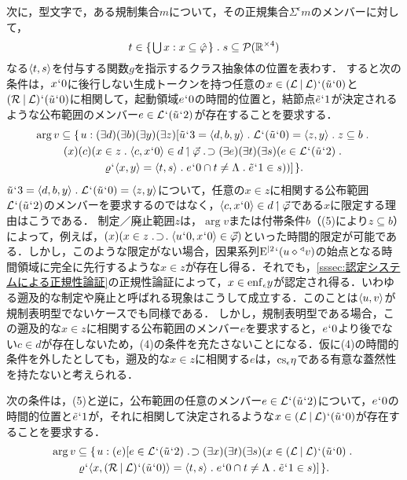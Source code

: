 次に，型文字\kagi{$ \varrho $}で，ある規制集合$ m $について，その正規集合$ \varSigma^{\epsilon}m $のメンバーに対して，
\[
    t\in\classab{\union{x}:x\subseteq\hat\varphi}\con{1}s\subseteq\mathcal{P}(\timex{\mathbb{R}}{4})
\]
なる$\langle t,s \rangle$を付与する関数$ g $を指示するクラス抽象体の位置を表わす．
すると次の条件は，$x{\mspace{1mu}{`}\mspace{1mu}} 0$に後行しない生成トークンを持つ任意の$ x\in (\mathcal{L}\mathbin{\mid}\mathcal{L}){\mspace{1mu}{`}\mspace{1mu}}(\tilde{u}{\mspace{1mu}{`}\mspace{1mu}} 0) $と$ (\mathcal{R}\mathbin{\mid}\mathcal{L}){\mspace{1mu}{`}\mspace{1mu}}(\tilde{u}{\mspace{1mu}{`}\mspace{1mu}} 0) $に相関して，起動領域$e{\mspace{1mu}{`}\mspace{1mu}} 0$の時間的位置と，結節点$ \tilde{e}{\mspace{1mu}{`}\mspace{1mu}} 1 $が決定されるような公布範囲のメンバー$ e\in \mathcal{L}{\mspace{1mu}{`}\mspace{1mu}}(\tilde{u}{\mspace{1mu}{`}\mspace{1mu}} 2) $が存在することを要求する．
\begin{multline}
    \arg v \subseteq \classab{u:(\exists d)(\exists b)(\exists y)(\exists z)[
        \tilde{u}\fap 3 = \orp{d,b,y}\con{1}\mathcal{L}\fap(\tilde{u}\fap 0) = \orp{z,y}\con{1}z\subseteq b \con{1}\\
        (x)(c)(x\in z\con{1}\orp{c,x\fap 0}\in d\uphl\vec{\varphi}\case{1}{1}{0}
        (\exists e)(\exists t)(\exists s)(e\in \mathcal{L}\fap(\tilde{u}\fap 2)\con{1}\\
            \varrho\fap\orp{x,y} = \orp{t,s}\con{1}e\fap 0\cap t\neq\Lambda\con{1}\tilde{e}\fap 1\in s
        )
        )
    ]
    }.
\end{multline}
$ \tilde{u}\fap 3 = \orp{d,b,y}\con{1}\mathcal{L}\fap(\tilde{u}\fap 0) = \orp{z,y} $について，任意の$ x\in z $に相関する公布範囲$ \mathcal{L}{\mspace{1mu}{`}\mspace{1mu}}(\tilde{u}{\mspace{1mu}{`}\mspace{1mu}} 2) $のメンバーを要求するのではなく，$ \langle c,x{\mspace{1mu}{`}\mspace{1mu}} 0 \rangle\in d\mathbin{\upharpoonleft}\vec{\varphi} $である$x$に限定する理由はこうである．
制定／廃止範囲$ z $は，$ \arg v $または付帯条件$b$（(5)により$ z\subseteq b $）によって，例えば，$ (x)(x\in z\case{1}{1}{1}\orp{u\fap 0,x\fap 0}\in\vec{\varphi}) $といった時間的限定が可能である．しかし，このような限定がない場合，因果系列$ \mathrm{E}^{\mid 2}{\mspace{1mu}{`}\mspace{1mu}}(u\diamond{^\triangleleft}v) $の始点となる時間領域に完全に先行するような$ x\in z $が存在し得る．それでも，\ref{sssec:認定システムによる正規性論証}の正規性論証によって，$ x\in\mathrm{enf}_{\epsilon}y $が認定され得る．いわゆる遡及的な制定や廃止と呼ばれる現象はこうして成立する．このことは$\langle u,v \rangle$が規制表明型でないケースでも同様である．
しかし，規制表明型である場合，この遡及的な$ x\in z $に相関する公布範囲のメンバー$e$を要求すると，$e{\mspace{1mu}{`}\mspace{1mu}} 0$より後でない$ c\in d $が存在しないため，(4)の条件を充たさないことになる．仮に(4)の時間的条件を外したとしても，遡及的な$ x\in z $に相関する$e$は，$ \mathrm{cs}_{\epsilon}\eta $である有意な蓋然性を持たないと考えられる．

次の条件は，(5)と逆に，公布範囲の任意のメンバー$ e\in \mathcal{L}{\mspace{1mu}{`}\mspace{1mu}}(\tilde{u}{\mspace{1mu}{`}\mspace{1mu}} 2) $について，$e{\mspace{1mu}{`}\mspace{1mu}} 0$の時間的位置と$ \tilde{e}{\mspace{1mu}{`}\mspace{1mu}} 1 $が，それに相関して決定されるような$x\in (\mathcal{L}\mathbin{\mid}\mathcal{L}){\mspace{1mu}{`}\mspace{1mu}}(\tilde{u}{\mspace{1mu}{`}\mspace{1mu}} 0)$が存在することを要求する．
\begin{multline}
    \arg v\subseteq\classab{u:
    (e)[e\in \mathcal{L}\fap(\tilde{u}\fap 2)\case{1}{1}{0}(\exists x)(\exists t)(\exists s)(
        x\in(\mathcal{L}\resl\mathcal{L})\fap(\tilde{u}\fap 0)\con{1}\\
        \varrho\fap\orp{x,(\mathcal{R}\resl\mathcal{L})\fap(\tilde{u}\fap 0)} = \orp{t,s}\con{1}e\fap 0\cap t\neq\Lambda\con{1}\tilde{e}\fap 1\in s
    )
    ]
    }.
\end{multline}

